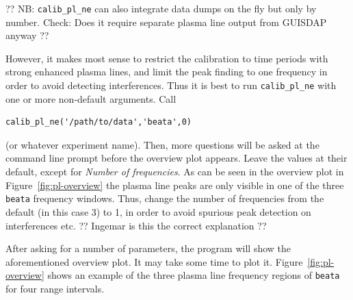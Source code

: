 \documentclass[a4]{article}
\begin{document}
?? NB: \texttt{calib\_pl\_ne} can also integrate data dumps on the fly but only by number. Check: Does it require separate plasma line output from GUISDAP anyway ??

However, it makes most sense to restrict the calibration to time
periods with strong enhanced plasma lines, and limit the peak finding
to one frequency in order to avoid detecting interferences. Thus it is
best to run  \texttt{calib\_pl\_ne} with one or more non-default arguments. Call

\begin{verbatim}
calib_pl_ne('/path/to/data','beata',0)
\end{verbatim}

(or whatever experiment name). Then, more questions will be asked at
the command line prompt before the overview plot appears.  Leave the
values at their default, except for \emph{Number of frequencies}. As
can be seen in the overview plot in Figure~\ref{fig:pl-overview} the
plasma line peaks are only visible in one of the three \texttt{beata}
frequency windows. Thus, change the number of frequencies from the
default (in this case 3) to 1, in order to avoid spurious peak
detection on interferences etc. ??  Ingemar is this the correct
explanation ??

After asking for a number of parameters, the program will show the
aforementioned overview plot. It may take some time to plot
it. Figure~\ref{fig:pl-overview} shows an example of the three plasma
line frequency regions of \texttt{beata} for four range intervals.
\end{document}
